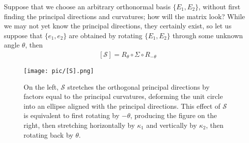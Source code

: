 \documentclass[10pt]{article}
\begin{document}
            \begin{definition}
                 Suppose that we choose an arbitrary orthonormal basis $\{E_1, E_2\}$, without first finding the principal directions and curvatures; how will the matrix look? While we may not yet know the principal directions, they certainly exist, so let us suppose that $\{e_1, e_2\}$ are obtained by rotating $\{E_1, E_2\}$ through some unknown angle $\theta$, then
                 \begin{equation*}
                     \begin{aligned}
                         [\mathcal{S}] = R_{\theta}\circ\Sigma\circ R_{-\theta}
                     \end{aligned}
                 \end{equation*}
            \end{definition}

            \begin{figure}[H]
                \centering
                \texttt{[image: pic/[S].png]}
                \caption{On the left, $\mathcal{S}$ stretches the orthogonal principal directions by factors equal to the principal curvatures, deforming the unit circle into an ellipse aligned with the principal directions. This effect of $\mathcal{S}$ is equivalent to first rotating by $-\theta$, producing the figure on the right, then stretching horizontally by $\kappa_1$ and vertically by $\kappa_2$, then rotating back by $\theta$.}
            \end{figure}
\end{document}
